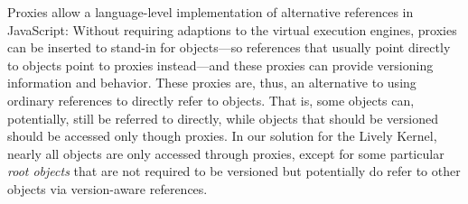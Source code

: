 Proxies allow a language-level implementation of alternative references in JavaScript:
Without requiring adaptions to the virtual execution engines, proxies can be inserted to stand-in for objects---so references that usually point directly to objects point to proxies instead---and these proxies can provide versioning information and behavior.
These proxies are, thus, an alternative to using ordinary references to directly refer to objects.
That is, some objects can, potentially, still be referred to directly, while objects that should be versioned should be accessed only though proxies.
In our solution for the Lively Kernel, nearly all objects are only accessed through proxies, except for some particular \emph{root objects} that are not required to be versioned but potentially do refer to other objects via version-aware references.


